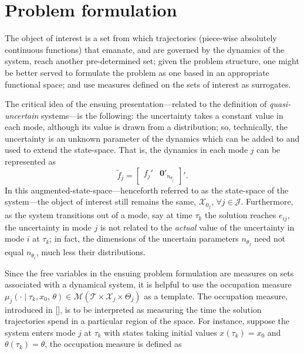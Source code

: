 \section{Problem formulation}
\label{sec:prob}

The object of interest is a set from which trajectories (piece-wise absolutely continuous functions) that emanate, and are governed by the dynamics of the system, reach another pre-determined set; given the problem structure, one might be better served to formulate the problem as one based in an appropriate functional space; and use measures defined on the sets of interest as surrogates.
\par
The critical idea of the ensuing presentation---related to the definition of \emph{quasi-uncertain} systems---is the following: the uncertainty takes a constant value in each mode, although its value is drawn from a distribution; so, technically, the uncertainty is an unknown parameter of the dynamics which can be added to and used to extend the state-space. That is, the dynamics in each mode $j$ can be represented as
$$\tilde f_j=\begin{bmatrix}
  f_j'&\mathbf{0}'_{n_{\theta_j}}
\end{bmatrix}'.$$
In this augmented-state-space---henceforth referred to as the state-space of the system---the object of interest still remains the same, $\mathcal X_{0_j},\,\forall j\in \mathcal J$. Furthermore, as the system transitions out of a mode, say at time $\tau_k$ the solution reaches $e_{ij}$, the uncertainty in mode $j$ is not related to the \emph{actual} value of the uncertainty in mode $i$ at $\tau_k$; in fact, the dimensions of the uncertain parameters $n_{\theta_j}$ need not equal $n_{\theta_i}$, much less their distributions.
\par
Since the free variables in the ensuing problem formulation are measures on sets associated with a dynamical system, it is helpful to use the occupation measure \mbox{$\mu_j(\cdot\mid \tau_k,x_0,\,\theta)\in \mathcal M(\mathcal T\times \mathcal X_j\times \Theta_j)$} as a template. The occupation measure, introduced in [], is to be interpreted as measuring the time the solution trajectories spend in a particular region of the space. For instance, suppose the system enters mode $j$ at $\tau_k$ with states taking initial values $x(\tau_k)=x_0$ and $\theta(\tau_k)=\theta$, the occupation measure is defined as

